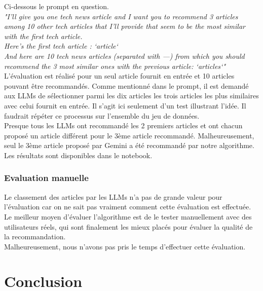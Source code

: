 \documentclass[a4paper,12pt]{article}
\begin{document}
Ci-dessous le prompt en question.\\

\textit{"I'll give you one tech news article and I want you to recommend 3 articles among 10 other tech articles that I'll provide  that seem to be the most similar with the first tech article.}\\

\textit{Here's the first tech article : `article`}\\

\textit{And here are 10 tech news articles (separated with ---) from which you should recommend the 3 most similar ones with the previous article:
`articles`"}\\

L'évaluation est réalisé pour un seul article fournit en entrée et 10 articles pouvant être recommandés. Comme mentionné dans le prompt, il est demandé aux LLMs de sélectionner parmi les dix articles les trois articles les plus similaires avec celui fournit en entrée. Il s'agit ici seulement d'un test illustrant l'idée. Il faudrait répéter ce processus sur l'ensemble du jeu de données.\\

Presque tous les LLMs ont recommandé les 2 premiers articles et ont chacun proposé un article différent pour le 3ème article recommandé. Malheureusement, seul le 3ème article proposé par Gemini a été recommandé par notre algorithme.\\

Les résultats sont disponibles dans le notebook.

\subsubsection{Evaluation manuelle}

Le classement des articles par les LLMs n’a pas de grande valeur pour l'évaluation car on ne sait pas vraiment comment cette évaluation est effectuée.\\

Le meilleur moyen d’évaluer l’algorithme est de le tester manuellement avec des utilisateurs réels, qui sont finalement les mieux placés pour évaluer la qualité de la recommandation.\\

Malheureusement, nous n'avons pas pris le temps d'effectuer cette évaluation. 


\section{Conclusion}
\end{document}
